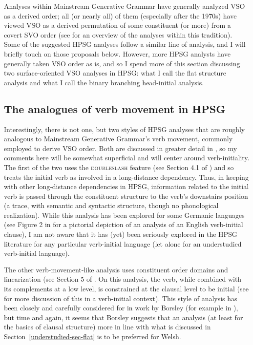 \documentclass[output=paper
                ,modfonts
                ,nonflat
	        ,collection
	        ,collectionchapter
	        ,collectiontoclongg
 	        ,biblatex
                ,babelshorthands
                ,newtxmath
                ,draftmode
                ,colorlinks, citecolor=brown
]{./langsci/langscibook}
\begin{document}
{Analyses within Mainstream Generative Grammar have generally analyzed VSO as a derived order; all (or nearly all) of them (especially after the 1970s) have viewed VSO as a derived permutation of some constituent (or more) from a covert SVO order (see \citealt{clemenspolinsky17} for an overview of the analyses within this tradition). Some of the suggested HPSG analyses follow a similar line of analysis, and I will briefly touch on those proposals below. However, more HPSG analysts have generally taken VSO order as is, and so I spend more of this section discussing two surface-oriented VSO analyses in HPSG: what I call the flat structure analysis and what I call the binary branching head-initial analysis.  

\subsection{The analogues of verb movement in HPSG}

Interestingly, there is not one, but two styles of HPSG analyses that are roughly analogous to Mainstream Generative Grammar's verb movement, commonly employed to derive VSO order. Both are discussed in greater detail in , so my comments here will be somewhat superficial and will center around verb-initiality. The first of the two uses the \textsc{doubleslash} feature (see Section 4.1 of ) and so treats the initial verb as involved in a long-distance dependency. Thus, in keeping with other long-distance dependencies in HPSG, information related to the initial verb is passed through the constituent structure to the verb's downstairs position (a trace, with semantic and syntactic structure, though no phonological realization). While this analysis has been explored for some Germanic languages (see Figure 2 in  for a pictorial depiction of an analysis of an English verb-initial clause), I am not aware that it has (yet) been seriously explored in the HPSG literature for any particular verb-initial language (let alone for an understudied verb-initial language).  

The other verb-movement-like analysis uses constituent order domains and linearization (see Section 5 of . On this analysis, the verb, while combined with its complements at a low level, is constrained at the clausal level to be initial (see \citealt{borsley06} for more discussion of this in a verb-initial context). This style of analysis has been closely and carefully considered for  in work by Borsley (for example in \citealt{Borsley89b,borsley95,Borsley2009a-u}), but time and again, it seems that Borsley suggests that an analysis (at least for the basics of clausal structure) more in line with what is discussed in Section~\ref{understudied-sec-flat} is to be preferred for Welsh.   

}
\end{document}
